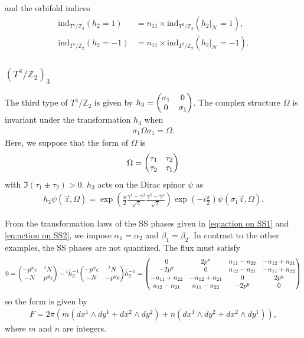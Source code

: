 \documentclass[11pt]{article}
\begin{document}
and the orbifold indices
\begin{align}
    \text{ind}_{T^4/\mathbb{Z}_2}(h_2=1)&= n_{11} \times \text{ind}_{T^2/\mathbb{Z}_2}(h_2 |_\mathcal{N}=1), \\
    \text{ind}_{T^4/\mathbb{Z}_2}(h_2=-1)&=n_{11}   \times \text{ind}_{T^2/\mathbb{Z}_2}(h_2 |_\mathcal{N}=-1).
\end{align}



\subsubsection{$(T^4/\mathbb{Z}_2)_3$}

The third type of $T^4/\mathbb{Z}_2$ is given by $h_3=\mqty(\sigma_1 & 0 \\ 0 &\sigma_1)$. The complex structure $\Omega$ is invariant under the transformation $h_3$ when
\begin{align}
    \sigma_1 \Omega \sigma_1= \Omega.
\end{align}
Here, we suppose that the form of $\Omega$ is
\begin{align}
    \Omega= \mqty( \tau_1 & \tau_2  \\ \tau_2   & \tau_1)
\end{align}
with $\Im (\tau_1 \pm \tau_2)>0  $. $h_3$ acts on the Dirac spinor $\psi$ as
\begin{align}
    h_3 \psi(\vec{z},\Omega)=\exp( \frac{\pi}{2} \frac{\gamma^1 - \gamma^3}{\sqrt{2}}\frac{\gamma^2 - \gamma^4}{\sqrt{2}})\exp( -i\frac{\pi}{2} )\psi( \sigma_1 \vec{z},\Omega).
\end{align}

From the transformation laws of the SS phases given in \eqref{eq:action on SS1} and \eqref{eq:action on SS2}, we impose $\alpha_1= \alpha_2 $ and $\beta_1=\beta_2$. In contrast to the other examples, the SS phases are not quantized. The flux must satisfy
\begin{align}
    0=\mqty( -p^x\epsilon & {}^tN \\-N & p^y \epsilon)  - {}^t \bar{h}^{-1}_2\mqty( -p^x \epsilon& {}^tN \\-N &- p^y\epsilon ) \bar{h}^{-1}_2=\left(\begin{matrix}0 & 2 p^{x} & n_{11} - n_{22} & - n_{12} + n_{21}\\- 2 p^{x} & 0 & n_{12} - n_{21} & - n_{11} + n_{22}\\- n_{11} + n_{22} & - n_{12} + n_{21} & 0 & 2 p^{y}\\n_{12} - n_{21} & n_{11} - n_{22} & - 2 p^{y} & 0\end{matrix}\right)
\end{align}
so the form is given by
\begin{align}
    F= 2 \pi(m (d{x^1} \wedge d{y^1}+d{x^2} \wedge d{y^2})+ n (d{x^1} \wedge d{y^2}+d{x^2} \wedge d{y^1})),
\end{align}
where $m $ and $n$ are integers.
\end{document}
